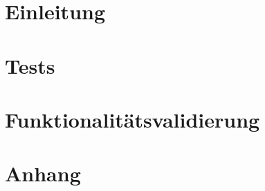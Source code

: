 

	\maketitle
	\setcounter{tocdepth}{1}
	\tableofcontents

	\chapter{Einleitung}
		
	\chapter{Tests}
	\label{chap:test}
		
	\chapter{Funktionalitätsvalidierung}
		
	\chapter{Anhang}
	\label{anhang}
		

